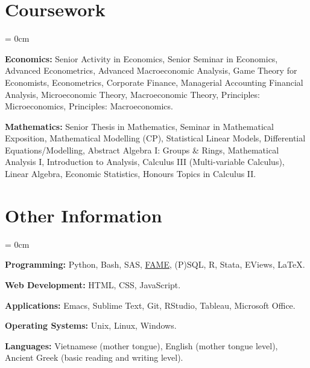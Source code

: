 \documentclass[a4paper, 11pt]{article}
\begin{document}
  \section{Coursework}
    \begin{compactitem}\parskip = 0cm
      \item \textbf{Economics:} Senior Activity in Economics, Senior Seminar in Economics, Advanced Econometrics, Advanced Macroeconomic Analysis, Game Theory for Economists, Econometrics, Corporate Finance,  Managerial Accounting Financial Analysis, Microeconomic Theory,  Macroeconomic Theory, Principles: Microeconomics, Principles: Macroeconomics.
      \item  \textbf{Mathematics:} Senior Thesis in Mathematics, Seminar in Mathematical Exposition, Mathematical Modelling (CP), Statistical Linear Models, Differential Equations/Modelling, Abstract Algebra I: Groups \& Rings, Mathematical Analysis I, Introduction to Analysis, Calculus III (Multi-variable Calculus), Linear Algebra, Economic Statistics, Honours Topics in Calculus II.
    \end{compactitem}

  \section{Other Information}
    \begin{compactitem}\parskip = 0cm
      \item \textbf{Programming:} Python, Bash, SAS, \href{https://en.wikipedia.org/wiki/FAME_(database)}{FAME}, (P)SQL, R, Stata, EViews, \LaTeX.
      \item \textbf{Web Development:} HTML, CSS, JavaScript.
      \item \textbf{Applications:} Emacs, Sublime Text, Git, RStudio, Tableau, Microsoft Office.
      \item \textbf{Operating Systems:} Unix, Linux, Windows.
      \item \textbf{Languages:} Vietnamese (mother tongue), English (mother tongue level), Ancient Greek (basic reading and writing level).
    \end{compactitem}

% 


  \iffalse
  \begin{publications}
    \printbib{publications}
  \end{publications}
  \fi
\end{document}

